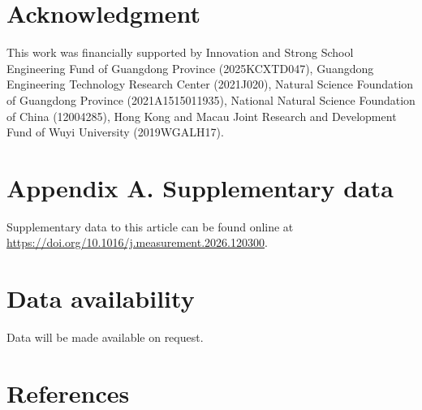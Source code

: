 \documentclass[11pt]{article}
\begin{document}
\section*{Acknowledgment}

This work was financially supported by Innovation and Strong
School Engineering Fund of Guangdong Province (2025KCXTD047),
Guangdong Engineering Technology Research Center (2021J020),
Natural Science Foundation of Guangdong Province (2021A1515011935),
National Natural Science Foundation of China (12004285), Hong Kong
and Macau Joint Research and Development Fund of Wuyi University
(2019WGALH17).

\section*{Appendix A. Supplementary data}

Supplementary data to this article can be found online at\\
\url{https://doi.org/10.1016/j.measurement.2026.120300}.

\section*{Data availability}

Data will be made available on request.

\section*{References}
\end{document}
